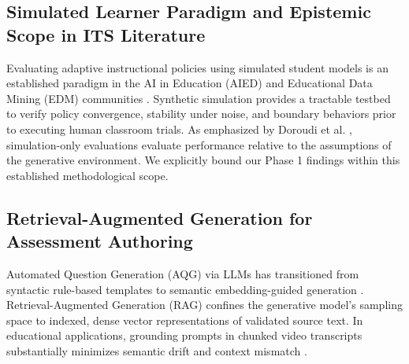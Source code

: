 \documentclass[journal]{IEEEtran}
\begin{document}
\subsection{Simulated Learner Paradigm and Epistemic Scope in ITS Literature}
Evaluating adaptive instructional policies using simulated student models is an established paradigm in the AI in Education (AIED) and Educational Data Mining (EDM) communities \cite{vanlehn2006behavior, rafferty2016faster, doroudi2019where, mandel2014offline}. Synthetic simulation provides a tractable testbed to verify policy convergence, stability under noise, and boundary behaviors prior to executing human classroom trials. As emphasized by Doroudi et al. \cite{doroudi2019where}, simulation-only evaluations evaluate performance relative to the assumptions of the generative environment. We explicitly bound our Phase 1 findings within this established methodological scope.

\subsection{Retrieval-Augmented Generation for Assessment Authoring}
Automated Question Generation (AQG) via LLMs has transitioned from syntactic rule-based templates to semantic embedding-guided generation \cite{lewis2020retrieval, prasath2024retrieval, scarlatos2024distractor}. Retrieval-Augmented Generation (RAG) confines the generative model's sampling space to indexed, dense vector representations of validated source text. In educational applications, grounding prompts in chunked video transcripts substantially minimizes semantic drift and context mismatch \cite{gao2023retrieval, lau2024evaluating}.
\end{document}
